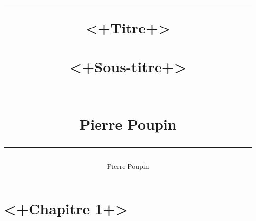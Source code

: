 \documentclass{scrreprt}
\title{%
\flushright
\rule{16cm}{5pt}\vskip1cm
\Huge{<+Titre+>}\\
\vspace{2cm}
~\\
\vspace{2cm}
<+Sous-titre+>\\
\vspace{2cm}
\LARGE{~\\}
\vspace{2cm}
\LARGE{~\\}
\vspace{2cm}
Pierre Poupin\\
\vfill
\rule{16cm}{5pt}
}
\date{}
\author{Pierre Poupin}
\begin{document}
\maketitle
\tableofcontents
\chapter{<+Chapitre 1+>}
\end{document}
